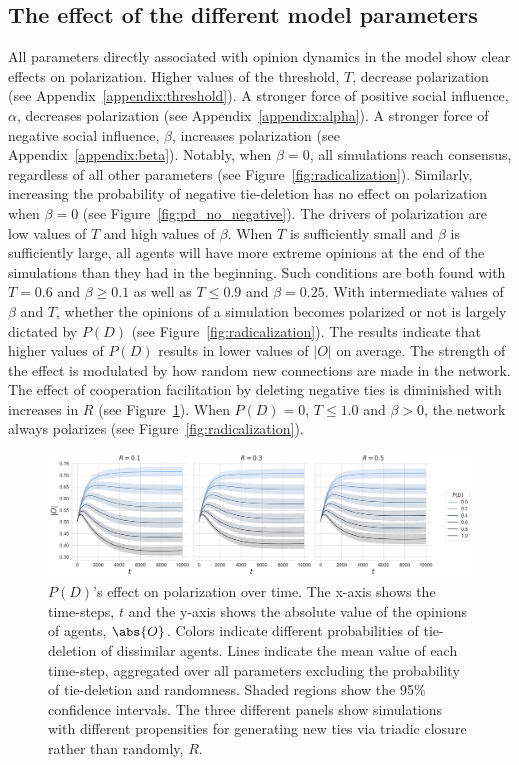 \documentclass[11pt]{article}
\DeclarePairedDelimiter{\abs}\lvert\rvert
\begin{document}
\subsection{The effect of the different model parameters}
All parameters directly associated with opinion dynamics in the model show clear effects on polarization. Higher values of the threshold, $T$, decrease polarization (see Appendix~\ref{appendix:threshold}). A stronger force of positive social influence, $\alpha$, decreases polarization (see Appendix~\ref{appendix:alpha}). A stronger force of negative social influence, $\beta$, increases polarization (see Appendix~\ref{appendix:beta}). Notably, when $\beta = 0$, all simulations reach consensus, regardless of all other parameters (see Figure~\ref{fig:radicalization}). Similarly, increasing the probability of negative tie-deletion has no effect on polarization when $\beta = 0$ (see Figure~\ref{fig:pd_no_negative}). 
The drivers of polarization are low values of $T$ and high values of $\beta$. When $T$ is sufficiently small and $\beta$ is sufficiently large, all agents will have more extreme opinions at the end of the simulations than they had in the beginning. Such conditions are both found with $T = 0.6$ and $\beta \geq 0.1$ as well as $T \leq 0.9$ and $\beta = 0.25$. With intermediate values of $\beta$ and $T$, whether the opinions of a simulation becomes polarized or not is largely dictated by $P(D)$ (see Figure~\ref{fig:radicalization}). 
The results indicate that higher values of $P(D)$ results in lower values of $|O|$ on average. 
The strength of the effect is modulated by how random new connections are made in the network. 
The effect of cooperation facilitation by deleting negative ties is diminished with increases in $R$ (see Figure~\ref{fig:pd}). 
When $P(D) = 0$, $T \leq 1.0$ and $\beta > 0$, the network always polarizes (see Figure~\ref{fig:radicalization}).

\begin{figure}[H]
    \centering
    \includegraphics[width=.98\linewidth]{../plots/overall/Absolute_Opinion_Tie_Dissolution.png}
  \caption{$P(D)$'s effect on polarization over time. The x-axis shows the time-steps, $t$ and the y-axis shows the absolute value of the opinions of agents, $\abs{O}$. Colors indicate different probabilities of tie-deletion of dissimilar agents. Lines indicate the mean value of each time-step, aggregated over all parameters excluding the probability of tie-deletion and randomness. Shaded regions show the 95\% confidence intervals. The three different panels show simulations with different propensities for generating new ties via triadic closure rather than randomly, $R$.}
  \label{fig:pd}
\end{figure}
\end{document}
